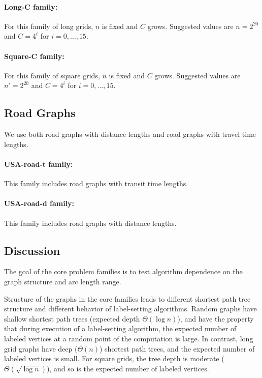 \documentclass[11pt]{article}
\begin{document}
\paragraph{Long-C family:}
For this family of long grids, $n$ is fixed and $C$ grows.
Suggested values are $n = 2^{20}$ and $C = 4^i$ for $i = 0, \ldots, 15$.

\paragraph{Square-C family:}
For this family of square grids, $n$ is fixed and $C$ grows.
Suggested values are $n' = 2^{20}$ and $C = 4^i$ for $i = 0, \ldots, 15$.


\subsection{Road Graphs}

We use both road graphs with distance lengths and road graphs with
travel time lengths.

\paragraph{USA-road-t family:} This family includes road graphs with
transit time lengths.

\paragraph{USA-road-d family:} This family includes road graphs with
distance lengths.

\subsection{Discussion}
\label{sec:nssp-d}

The goal of the core problem families is to test algorithm dependence
on the graph structure and arc length range.

Structure of the graphs in the core families leads to different
shortest path tree structure and different behavior of label-setting
algorithms.
Random graphs have shallow shortest path trees (expected depth 
$\Theta(\log n)$), and have the property that during execution of
a label-setting algorithm, the expected number of labeled vertices
at a random point of the computation is large.
In contrast, long grid graphs have deep ($\Theta(n)$) shortest path
trees, and the expected number of labeled vertices is small.
For square grids, the tree depth is moderate ($\Theta(\sqrt{\log n})$),
and so is the expected number of labeled vertices.
\end{document}
